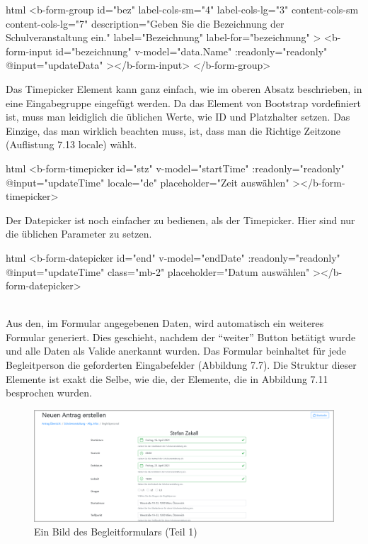 \begin{code}{html}
	<b-form-group
        id="bez"
        label-cols-sm="4"
        label-cols-lg="3"
        content-cols-sm
        content-cols-lg="7"
        description="Geben Sie die Bezeichnung der Schulveranstaltung ein."
        label="Bezeichnung"
        label-for="bezeichnung"
    >
        <b-form-input
            id="bezeichnung"
            v-model="data.Name"
            :readonly="readonly"
            @input="updateData"
        ></b-form-input>
    </b-form-group>
\end{code}
Das Timepicker Element kann ganz einfach, wie im oberen Absatz beschrieben, in eine Eingabegruppe eingefügt werden. Da das Element von Bootstrap vordefiniert ist, muss man leidiglich die üblichen Werte, wie ID und Platzhalter setzen. Das Einzige, das man wirklich beachten muss, ist, dass man die Richtige Zeitzone (Auflistung 7.13 locale) wählt.
\begin{code}{html}
	<b-form-timepicker
		id="stz"
		v-model="startTime"
		:readonly="readonly"
		@input="updateTime"
		locale="de"
		placeholder="Zeit auswählen"
  	></b-form-timepicker>
\end{code}
Der Datepicker ist noch einfacher zu bedienen, als der Timepicker. Hier sind nur die üblichen Parameter zu setzen.
\begin{code}{html}
	<b-form-datepicker
		id="end"
		v-model="endDate"
		:readonly="readonly"
		@input="updateTime"
		class="mb-2"
		placeholder="Datum auswählen"
  	></b-form-datepicker>
\end{code}
	\label{list:bspinputgroup} ~\\
Aus den, im Formular angegebenen Daten, wird automatisch ein weiteres Formular generiert. Dies geschieht, nachdem der \enquote{weiter} Button betätigt wurde und alle Daten als Valide anerkannt wurden. Das Formular beinhaltet für jede Begleitperson die geforderten Eingabefelder (Abbildung 7.7). Die Struktur dieser Elemente ist exakt die Selbe, wie die, der Elemente, die in Abbildung 7.11 besprochen wurden. 
\begin{figure}[H]
	\centering
	\includegraphics[width=1\linewidth]{images/website/schul_3_1}
	\caption[Neuer Schulantrag]{Ein Bild des Begleitformulars (Teil 1)}
	\label{fig:schulantrag3}
\end{figure}
